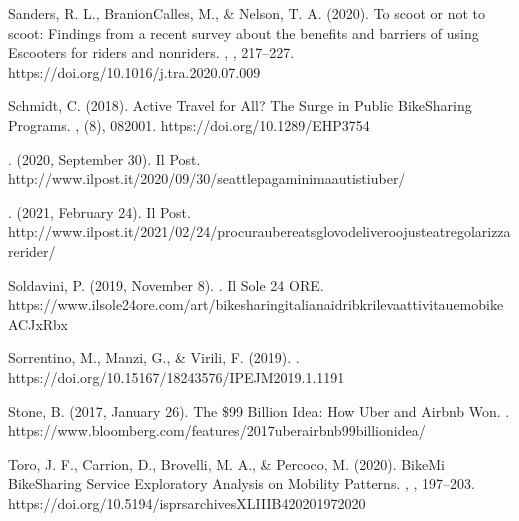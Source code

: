 \documentclass[letterpaper,10pt,english]{jupyterBook}
\begin{document}
\sphinxAtStartPar
Sanders, R. L., Branion\sphinxhyphen{}Calles, M., \& Nelson, T. A. (2020). To scoot or not to scoot: Findings from a recent survey about the benefits and barriers of using E\sphinxhyphen{}scooters for riders and non\sphinxhyphen{}riders. , , 217–227. https://doi.org/10.1016/j.tra.2020.07.009

\sphinxAtStartPar
Schmidt, C. (2018). Active Travel for All? The Surge in Public Bike\sphinxhyphen{}Sharing Programs. , (8), 082001. https://doi.org/10.1289/EHP3754

\sphinxAtStartPar
{}. (2020, September 30). Il Post. http://www.ilpost.it/2020/09/30/seattle\sphinxhyphen{}paga\sphinxhyphen{}minima\sphinxhyphen{}autisti\sphinxhyphen{}uber/

\sphinxAtStartPar
{}. (2021, February 24). Il Post. http://www.ilpost.it/2021/02/24/procura\sphinxhyphen{}uber\sphinxhyphen{}eats\sphinxhyphen{}glovo\sphinxhyphen{}deliveroo\sphinxhyphen{}just\sphinxhyphen{}eat\sphinxhyphen{}regolarizzare\sphinxhyphen{}rider/

\sphinxAtStartPar
Soldavini, P. (2019, November 8). . Il Sole 24 ORE. https://www.ilsole24ore.com/art/bike\sphinxhyphen{}sharing\sphinxhyphen{}italiana\sphinxhyphen{}idri\sphinxhyphen{}bk\sphinxhyphen{}rileva\sphinxhyphen{}attivita\sphinxhyphen{}ue\sphinxhyphen{}mobike\sphinxhyphen{}ACJxRbx

\sphinxAtStartPar
Sorrentino, M., Manzi, G., \& Virili, F. (2019). . https://doi.org/10.15167/1824\sphinxhyphen{}3576/IPEJM2019.1.1191

\sphinxAtStartPar
Stone, B. (2017, January 26). The \$99 Billion Idea: How Uber and Airbnb Won. . https://www.bloomberg.com/features/2017\sphinxhyphen{}uber\sphinxhyphen{}airbnb\sphinxhyphen{}99\sphinxhyphen{}billion\sphinxhyphen{}idea/

\sphinxAtStartPar
Toro, J. F., Carrion, D., Brovelli, M. A., \& Percoco, M. (2020). BikeMi Bike\sphinxhyphen{}Sharing Service Exploratory Analysis on Mobility Patterns. , , 197–203. https://doi.org/10.5194/isprs\sphinxhyphen{}archives\sphinxhyphen{}XLIII\sphinxhyphen{}B4\sphinxhyphen{}2020\sphinxhyphen{}197\sphinxhyphen{}2020
\end{document}
